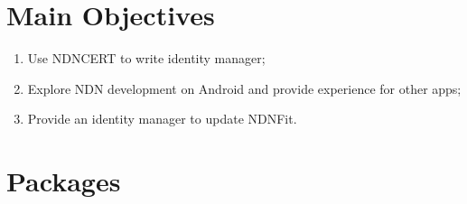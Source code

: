 \documentclass[a0,portrait]{poster}
\begin{document}
\begin{multicols}{2}
\color{DarkSlateGray} %

\section*{Main Objectives}

\begin{enumerate}
\item Use NDNCERT to write identity manager;
\item Explore NDN development on Android and provide experience for other apps;
\item Provide an identity manager to update NDNFit.
\end{enumerate}


\section*{Packages}



\end{multicols}
\end{document}
